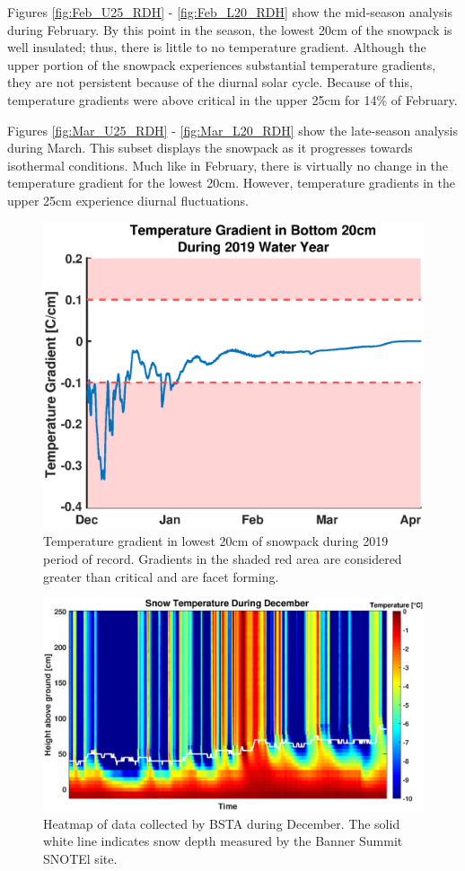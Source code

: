 Figures  \ref{fig:Feb_U25_RDH} - \ref{fig:Feb_L20_RDH} show the mid-season analysis during February. By this point in the season, the lowest 20cm of the snowpack is well insulated; thus, there is little to no temperature gradient. Although the upper portion of the snowpack experiences substantial temperature gradients, they are not persistent because of the diurnal solar cycle. Because of this, temperature gradients were above critical in the upper 25cm for 14\% of February. 

Figures \ref{fig:Mar_U25_RDH} - \ref{fig:Mar_L20_RDH} show the late-season analysis during March. This subset displays the snowpack as it progresses towards isothermal conditions.  Much like in February, there is virtually no change in the temperature gradient for the lowest 20cm. However, temperature gradients in the upper 25cm experience diurnal fluctuations.

 \begin{figure}[H]
    \centering
    \includegraphics[width=0.7\linewidth]{figures/TempGrad/WY2019_L20_Grad.eps}
    \caption{Temperature gradient in lowest 20cm of snowpack during 2019 period of record. Gradients in the shaded red area are considered greater than critical and are facet forming.}
    \label{fig:WY2019_L20_Grad}
 \end{figure}
 
\begin{figure}[H]
    \centering
    \includegraphics[width=0.95\linewidth]{figures/TempGrad/Dec_Heatmap.eps}
    \caption{Heatmap of data collected by BSTA during December. The solid white line indicates snow depth measured by the Banner Summit SNOTEl site.}
    \label{fig:Dec_U25_RDH}
 \end{figure}
 
